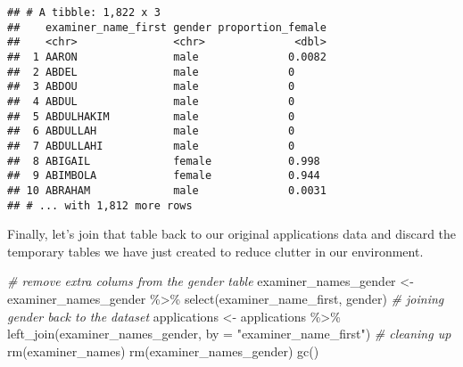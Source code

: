 \documentclass[
]{article}
\newenvironment{Shaded}{\begin{snugshade}}{\end{snugshade}}
\newcommand{\AttributeTok}[1]{\textcolor[rgb]{0.77,0.63,0.00}{#1}}
\newcommand{\CommentTok}[1]{\textcolor[rgb]{0.56,0.35,0.01}{\textit{#1}}}
\newcommand{\ConstantTok}[1]{\textcolor[rgb]{0.00,0.00,0.00}{#1}}
\newcommand{\FunctionTok}[1]{\textcolor[rgb]{0.00,0.00,0.00}{#1}}
\newcommand{\NormalTok}[1]{#1}
\newcommand{\OtherTok}[1]{\textcolor[rgb]{0.56,0.35,0.01}{#1}}
\newcommand{\SpecialCharTok}[1]{\textcolor[rgb]{0.00,0.00,0.00}{#1}}
\newcommand{\StringTok}[1]{\textcolor[rgb]{0.31,0.60,0.02}{#1}}
\begin{document}
\begin{Shaded}
\end{Shaded}

\begin{verbatim}
## # A tibble: 1,822 x 3
##    examiner_name_first gender proportion_female
##    <chr>               <chr>              <dbl>
##  1 AARON               male              0.0082
##  2 ABDEL               male              0     
##  3 ABDOU               male              0     
##  4 ABDUL               male              0     
##  5 ABDULHAKIM          male              0     
##  6 ABDULLAH            male              0     
##  7 ABDULLAHI           male              0     
##  8 ABIGAIL             female            0.998 
##  9 ABIMBOLA            female            0.944 
## 10 ABRAHAM             male              0.0031
## # ... with 1,812 more rows
\end{verbatim}

Finally, let's join that table back to our original applications data
and discard the temporary tables we have just created to reduce clutter
in our environment.

\begin{Shaded}
\begin{Highlighting}[]
\CommentTok{\# remove extra colums from the gender table}
\NormalTok{examiner\_names\_gender }\OtherTok{\textless{}{-}}\NormalTok{ examiner\_names\_gender }\SpecialCharTok{\%\textgreater{}\%} 
  \FunctionTok{select}\NormalTok{(examiner\_name\_first, gender)}
\CommentTok{\# joining gender back to the dataset}
\NormalTok{applications }\OtherTok{\textless{}{-}}\NormalTok{ applications }\SpecialCharTok{\%\textgreater{}\%} 
  \FunctionTok{left\_join}\NormalTok{(examiner\_names\_gender, }\AttributeTok{by =} \StringTok{"examiner\_name\_first"}\NormalTok{)}
\CommentTok{\# cleaning up}
\FunctionTok{rm}\NormalTok{(examiner\_names)}
\FunctionTok{rm}\NormalTok{(examiner\_names\_gender)}
\FunctionTok{gc}\NormalTok{()}
\end{Highlighting}
\end{Shaded}
\end{document}
